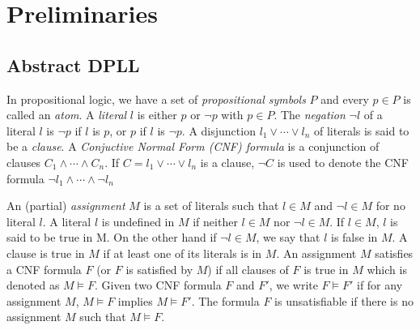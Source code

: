 \chapter{Preliminaries}
\section{Abstract DPLL}
In propositional logic, we have a set of \emph{propositional symbols} $P$ and every $p \in P$ is called an \emph{atom}. A \emph{literal} $l$ is either $p$ or $\neg p$ with $p \in P$. The \emph{negation} $\neg l$ of a literal $l$ is $\neg p$ if $l$ is $p$, or $p$ if $l$ is $\neg p$. A disjunction $l_1 \vee \cdots \vee l_n$ of literals is said to be a \emph{clause}. A \emph{Conjuctive Normal Form (CNF) formula} is a conjunction of clauses $C_1 \wedge \cdots \wedge C_n$. If $C = l_1 \vee \cdots \vee l_n$ is a clause, $\neg C$ is used to denote the CNF formula $\neg l_1 \wedge \cdots \wedge \neg l_n$

An (partial) \emph{assignment} $M$ is a set of literals such that $l \in M$ and $\neg l \in M$ for no literal $l$. A literal $l$ is undefined in $M$ if neither $l \in M$ nor $\neg l \in M$. If $l \in M$, $l$ is said to be true in M. On the other hand if $\neg l \in M$, we say that $l$ is false in $M$. A clause is true in $M$ if at least one of its literals is in $M$. An assignment $M$ satisfies a CNF formula $F$ (or $F$ is satisfied by $M$) if all clauses of $F$ is true in $M$ which is denoted as $M \models F$. Given two CNF formula $F$ and $F'$, we write $F \models F'$ if for any assignment $M$, $M \models F$ implies $M \models F'$. The formula $F$ is unsatisfiable if there is no assignment $M$ such that $M \models F$.

